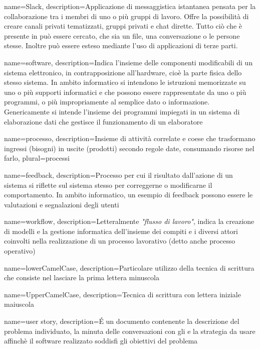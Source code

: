 {
	name=Slack,
	description={Applicazione di messaggistica istantanea pensata per la collaborazione tra i membri di uno o più gruppi di lavoro.  Offre la possibilità di creare canali privati tematizzati, gruppi privati e chat dirette. Tutto ciò che è presente in  può essere cercato, che sia un file, una conversazione o le persone stesse.  Inoltre può essere esteso mediante l’uso di applicazioni di terze parti.}
}

{
	name=software,
	description={Indica l'insieme delle componenti modificabili di un sistema elettronico, in contrapposizione all'hardware, cioè la parte fisica dello stesso sistema. In ambito informatico si intendono le istruzioni memorizzate su uno o più supporti informatici e che possono essere rappresentate da uno o più programmi, o più impropriamente al semplice dato o informazione. Genericamente si intende l’insieme dei programmi impiegati in un sistema di elaborazione dati che gestisce il funzionamento di un elaboratore}
}

{
	name=processo,
	description={Insieme di attività correlate e coese che trasformano ingressi (bisogni) in uscite (prodotti) secondo regole date, consumando risorse nel farlo},
	plural=processi
}

{
	name=feedback,
	description={Processo per cui il risultato dall'azione di un sistema si riflette sul sistema stesso per correggerne o modificarne il comportamento. In ambito informatico, un esempio di feedback possono essere le valutazioni e segnalazioni degli utenti}
}

{
	name=workflow,
	description={Letteralmente \emph{"flusso di lavoro"}, indica la creazione di modelli e la gestione informatica dell'insieme dei compiti e i diversi attori coinvolti nella realizzazione di un processo lavorativo (detto anche processo operativo)}
}

{
  name=lowerCamelCase,
  description={Particolare utilizzo della tecnica di scrittura  che consiste nel lasciare la prima lettera minuscola}
}


{
  name=UpperCamelCase,
  description={Tecnica di scrittura  con lettera iniziale maiuscola}
}

{
	name=user story,
	description={\'E un documento contenente la descrizione del problema individuato, la minuta delle conversazioni con gli  e la strategia da usare affinchè il software realizzato soddisfi gli obiettivi del problema}
}

